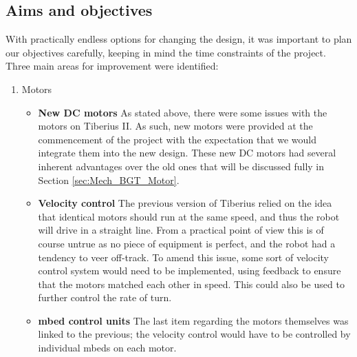 \subsection{Aims and objectives}
With practically endless options for changing the design, it was important to plan our objectives carefully, keeping in mind the time constraints of the project. Three main areas for improvement were identified:

\begin{enumerate}
\item Motors
\begin{itemize}
\item \textbf{New DC motors}
\newline
As stated above, there were some issues with the motors on Tiberius II. As such, new motors were provided at the commencement of the project with the expectation that we would integrate them into the new design. These new DC motors had several inherent advantages over the old ones that will be discussed fully in Section \ref{sec:Mech_BGT_Motor}.

\item \textbf{Velocity control}
\newline
The previous version of Tiberius relied on the idea that identical motors should run at the same speed, and thus the robot will drive in a straight line. From a practical point of view this is of course untrue as no piece of equipment is perfect, and the robot had a tendency to veer off-track. To amend this issue, some sort of velocity control system would need to be implemented, using feedback to ensure that the motors matched each other in speed. This could also be used to further control the rate of turn.
        
\item \textbf{mbed control units}
\newline
The last item regarding the motors themselves was linked to the previous; the velocity control would have to be controlled by individual mbeds on each motor.
\end{itemize}


\end{enumerate}
